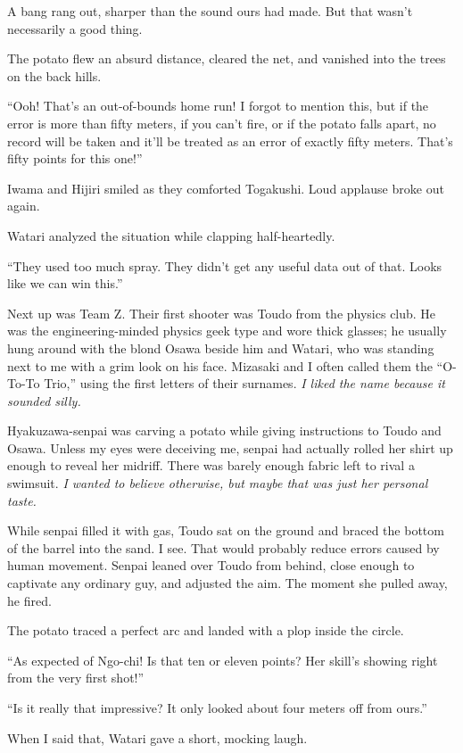 \documentclass[
    a4paper,
    12pt,
    twoside,
    openany,
    UTF8,
    fontset=windows
]{ctexbook}
\begin{document}
A bang rang out, sharper than the sound ours had made. But that wasn't necessarily a good thing.

The potato flew an absurd distance, cleared the net, and vanished into the trees on the back hills.

``Ooh! That's an out-of-bounds home run! I forgot to mention this, but if the error is more than fifty meters, if you can't fire, or if the potato falls apart, no record will be taken and it'll be treated as an error of exactly fifty meters. That's fifty points for this one!''

Iwama and Hijiri smiled as they comforted Togakushi. Loud applause broke out again.

Watari analyzed the situation while clapping half-heartedly.

``They used too much spray. They didn't get any useful data out of that. Looks like we can win this.''

Next up was Team Z. Their first shooter was Toudo from the physics club. He was the engineering-minded physics geek type and wore thick glasses; he usually hung around with the blond Osawa beside him and Watari, who was standing next to me with a grim look on his face. Mizasaki and I often called them the ``O-To-To Trio,'' using the first letters of their surnames. \textit{I liked the name because it sounded silly.}

Hyakuzawa-senpai was carving a potato while giving instructions to Toudo and Osawa. Unless my eyes were deceiving me, senpai had actually rolled her shirt up enough to reveal her midriff. There was barely enough fabric left to rival a swimsuit. \textit{I wanted to believe otherwise, but maybe that was just her personal taste.}

While senpai filled it with gas, Toudo sat on the ground and braced the bottom of the barrel into the sand. I see. That would probably reduce errors caused by human movement. Senpai leaned over Toudo from behind, close enough to captivate any ordinary guy, and adjusted the aim. The moment she pulled away, he fired.

The potato traced a perfect arc and landed with a plop inside the circle.

``As expected of Ngo-chi! Is that ten or eleven points? Her skill's showing right from the very first shot!''

``Is it really that impressive? It only looked about four meters off from ours.''

When I said that, Watari gave a short, mocking laugh.
\end{document}
